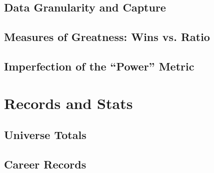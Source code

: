 \documentclass[a4paper,twoside,titlepage]{book}
\begin{document}
    \chapter{Data Granularity and Capture}
    \chapter{Measures of Greatness: Wins vs. Ratio}
    \chapter{Imperfection of the ``Power'' Metric}
  \part{Records and Stats}
    \chapter{Universe Totals}
    \chapter{Career Records}
\end{document}
